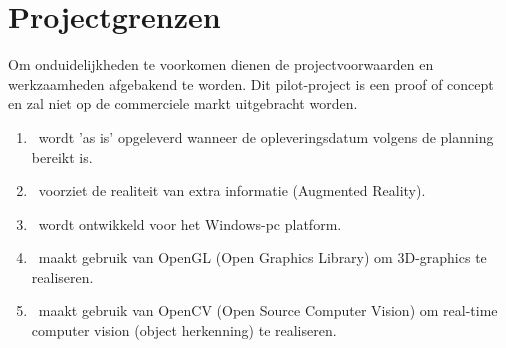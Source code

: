 \chapter{Projectgrenzen} \label{cha:projectgrenzen}
Om onduidelijkheden te voorkomen dienen de projectvoorwaarden en werkzaamheden afgebakend te worden. Dit pilot-project is een proof of concept en zal niet op de commerciele markt uitgebracht worden.
\\
\begin{enumerate}
  \item \projectname\ wordt 'as is' opgeleverd wanneer de opleveringsdatum volgens de planning bereikt is.
  \item \projectname\ voorziet de realiteit van extra informatie (Augmented Reality).
  \item \projectname\ wordt ontwikkeld voor het Windows-pc platform.
  \item \projectname\ maakt gebruik van OpenGL (Open Graphics Library) om 3D-graphics te realiseren.
  \item \projectname\ maakt gebruik van OpenCV (Open Source Computer Vision) om real-time computer vision (object herkenning) te realiseren.
\end{enumerate}